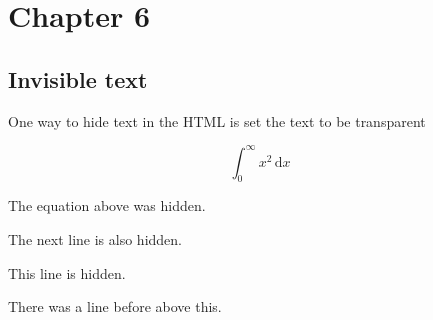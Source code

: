 \documentclass[
  a4paper,
  DIV=11,
  numbers=noendperiod,
  oneside]{scrreprt}
\author{}
\date{}
\newcommand{\dx}{\,\text{d}x}
\newenvironment{invisible-text}{\color{white}}{}
\begin{document}
\chapter{Chapter 6}\label{chapter-6}

\section{Invisible text}\label{invisible-text}

One way to hide text in the HTML is set the text to be transparent

\begin{invisible-text}
\[
\int_0^{\infty} x^2 \dx
\]

\end{invisible-text}

The equation above was hidden.

The next line is also hidden.

\begin{invisible-text}
This line is hidden.

\end{invisible-text}

There was a line before above this.
\end{document}
